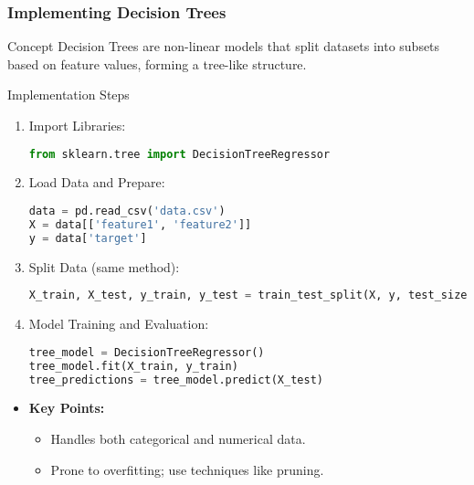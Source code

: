\documentclass[aspectratio=169]{beamer}
\begin{document}
\begin{frame}[fragile]
    \frametitle{Implementing Decision Trees}
    \begin{block}{Concept}
        Decision Trees are non-linear models that split datasets into subsets based on feature values, forming a tree-like structure.
    \end{block}
    
    \begin{block}{Implementation Steps}
        \begin{enumerate}
            \item Import Libraries:
            \begin{lstlisting}[language=Python]
from sklearn.tree import DecisionTreeRegressor
            \end{lstlisting}
            \item Load Data and Prepare:
            \begin{lstlisting}[language=Python]
data = pd.read_csv('data.csv')
X = data[['feature1', 'feature2']]
y = data['target']
            \end{lstlisting}
            \item Split Data (same method):
            \begin{lstlisting}[language=Python]
X_train, X_test, y_train, y_test = train_test_split(X, y, test_size=0.2, random_state=42)
            \end{lstlisting}
            \item Model Training and Evaluation:
            \begin{lstlisting}[language=Python]
tree_model = DecisionTreeRegressor()
tree_model.fit(X_train, y_train)
tree_predictions = tree_model.predict(X_test)
            \end{lstlisting}
        \end{enumerate}
    \end{block}

    \begin{itemize}
        \item \textbf{Key Points:}
        \begin{itemize}
            \item Handles both categorical and numerical data.
            \item Prone to overfitting; use techniques like pruning.
        \end{itemize}
    \end{itemize}
\end{frame}
\end{document}
